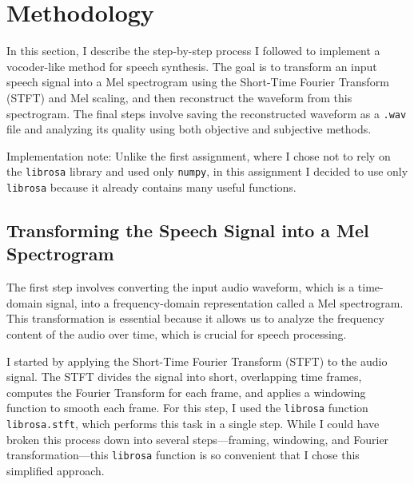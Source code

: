 \documentclass[12pt]{article}
\begin{document}



\section{Methodology}

In this section, I describe the step-by-step process I followed to implement a vocoder-like method for speech synthesis. The goal is to transform an input speech signal into a Mel spectrogram using the Short-Time Fourier Transform (STFT) and Mel scaling, and then reconstruct the waveform from this spectrogram. The final steps involve saving the reconstructed waveform as a \texttt{.wav} file and analyzing its quality using both objective and subjective methods.

Implementation note: Unlike the first assignment, where I chose not to rely on the \texttt{librosa} library and used only \texttt{numpy}, in this assignment I decided to use only \texttt{librosa} because it already contains many useful functions.

\subsection{Transforming the Speech Signal into a Mel Spectrogram}

The first step involves converting the input audio waveform, which is a time-domain signal, into a frequency-domain representation called a Mel spectrogram. This transformation is essential because it allows us to analyze the frequency content of the audio over time, which is crucial for speech processing.

I started by applying the Short-Time Fourier Transform (STFT) to the audio signal. The STFT divides the signal into short, overlapping time frames, computes the Fourier Transform for each frame, and applies a windowing function to smooth each frame. For this step, I used the \texttt{librosa} function \texttt{librosa.stft}, which performs this task in a single step. While I could have broken this process down into several steps—framing, windowing, and Fourier transformation—this \texttt{librosa} function is so convenient that I chose this simplified approach.
\end{document}
